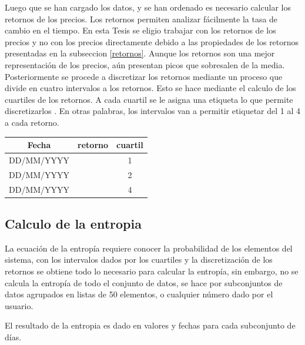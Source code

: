 Luego que se han cargado los datos, y se han ordenado es necesario calcular los retornos de los precios. 
Los retornos permiten analizar fácilmente la tasa de cambio en el tiempo.
En esta Tesis se eligio trabajar con los retornos de los precios y no con los precios directamente debido a las propiedades de los retornos presentadas en la subseccion \ref{retornos}.
Aunque los retornos son una mejor representación de los precios, aún presentan picos que sobresalen de la media. 
Posteriormente se procede a discretizar los retornos mediante un proceso que divide en cuatro intervalos a los retornos. 
Esto se hace mediante el calculo de los cuartiles de los retornos. 
A cada cuartil se le asigna una etiqueta lo que permite discretizarlos . 
En otras palabras, los intervalos van a permitir etiquetar del 1 al 4 a cada retorno. 

\begin{center}
	\begin{tabular}{|c|c|c|}
		\hline 
		Fecha & retorno & cuartil \\ 
		\hline 
		DD/MM/YYYY & $$$$ & 1\\ 
		\hline 
		DD/MM/YYYY & $$$$ & 2\\ 
		\hline 
		DD/MM/YYYY & $$$$ & 4\\ 
		\hline 
	\end{tabular} 
	\label{ejemplo_data-returns}
\end{center}

\subsection{Calculo de la entropia}

La ecuación de la entropía requiere conocer la probabilidad de los elementos del sistema, 
con los intervalos dados por los cuartiles y la discretización de los retornos se obtiene todo lo necesario para calcular la entropía, sin embargo, no se calcula la entropía de todo el conjunto de datos, se hace por subconjuntos de datos agrupados en listas de 50 elementos, o cualquier número dado por el usuario.

El resultado de la entropia es dado en valores y fechas para cada subconjunto de días.




